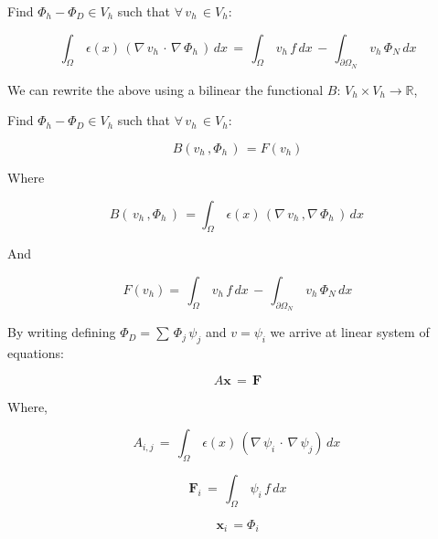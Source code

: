 \documentclass[10pt]{report}
\numberwithin{equation}{section}
\begin{document}
\begin{center}
Find $\Phi_{h}-\Phi_{D} \in V_{h}$ such that $\forall \,  v_{h} \, \in  V_{h}$:
\end{center}

\begin{equation} \label{eq:FEMPoisson}
\int_{\Omega} \, \epsilon(x) \, \left(  \nabla \, v_{h} \, \cdot \,  \nabla  \, \Phi_{h} \, 
\right) \, dx \, 
=  \, \int_{\Omega}  \, v_{h} \,  f \, dx \, - \, \int_{\partial \Omega_{N}} \,  v_{h}  \, \Phi_{N} \, dx
\end{equation}

\vspace{3mm}


\noindent
We can rewrite the above using a  bilinear the functional $B: \, V_{h} \times V_{h} \rightarrow \mathbb{R}$, 

\begin{center}
Find $\Phi_{h}-\Phi_{D} \in V_{h}$ such that $\forall \,  v_{h} \, \in  V_{h}$:
\end{center}

\begin{equation}\label{eq:PoissonBilinear}
B \left( v_{h} \, , \Phi_{h} \, \right) \,  
=  F(v_{h})
\end{equation}


\noindent
Where 

$$B\left( \, v_{h} \, , \Phi_{h} \, \right) \, =
  \int_{\Omega} \, \epsilon(x) \, \left( \nabla \, v_{h} \, ,  \nabla  \, \Phi_{h} \,
 \right) \, dx \, $$ 
 
 
\noindent
And 


$$ F(v_{h})  =  \, \int_{\Omega} \, v_{h} \,  f  \, dx   \, - \, \int_{\partial \Omega_{N}} \,  v_{h}  \, \Phi_{N} \, dx$$


\vspace{3mm}

\noindent
By writing defining $\Phi_{D} = \sum \, \Phi_{j} \, \psi_{j}$ and $v = \psi_{i}$ we arrive at linear system of equations:

$$ A \textbf{x} \, = \, \textbf{F} $$


\noindent
Where,

$$ A_{i,j} \, = \,   \int_{\Omega} \, \epsilon(x) \, \left(  \nabla  \, \psi_{i} \, \cdot \, \nabla \, \psi_{j} \right) \, dx \, $$


$$ \textbf{F}_{i} \, =  \, \int_{\Omega} \,  \psi_{i} \,  f \,dx $$


$$ \textbf{x}_{i} \, = \Phi_{i} $$
\end{document}
